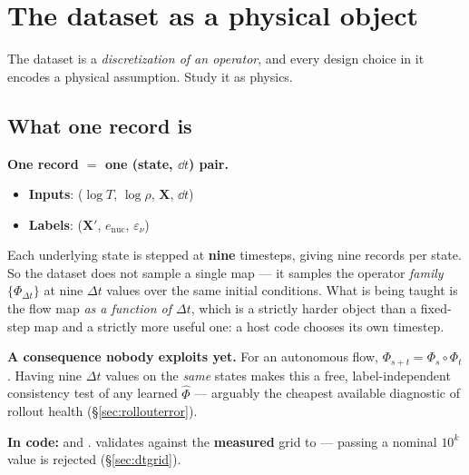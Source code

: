 \section{The dataset as a physical object}
\label{part:dataset}

The dataset is a \emph{discretization of an operator}, and every design choice
in it encodes a physical assumption. Study it as physics.

\subsection{What one record is}
\label{sec:onerecord}

\begin{result}
\textbf{One record $=$ one (state, $\dd t$) pair.}
\end{result}

\begin{itemize}
\item \textbf{Inputs}: ($\log T$, $\log\rho$, $\mathbf{X}$, $\dd t$)
\item \textbf{Labels}: ($\mathbf{X}'$, $e_{\text{nuc}}$, $\varepsilon_\nu$)
\end{itemize}

Each underlying state is stepped at \textbf{nine} timesteps, giving nine records
per state. So the dataset does not sample a single map --- it samples the
operator \emph{family} $\{\Phi_{\Delta t}\}$ at nine $\Delta t$ values over the
same initial conditions. What is being taught is the flow map \emph{as a
function of $\Delta t$}, which is a strictly harder object than a fixed-step map
and a strictly more useful one: a host code chooses its own timestep.

\textbf{A consequence nobody exploits yet.} For an autonomous flow,
$\Phi_{s+t} = \Phi_s \circ \Phi_t$. Having nine $\Delta t$ values on the
\emph{same} states makes this a free, label-independent consistency test of any
learned $\hat\Phi$ --- arguably the cheapest available diagnostic of rollout
health (\S\ref{sec:rollouterror}).

\begin{repopointer}
\textbf{In code:}  and .
 validates  against the
\textbf{measured} grid to  --- passing a nominal $10^k$
value is rejected (\S\ref{sec:dtgrid}).
\end{repopointer}


